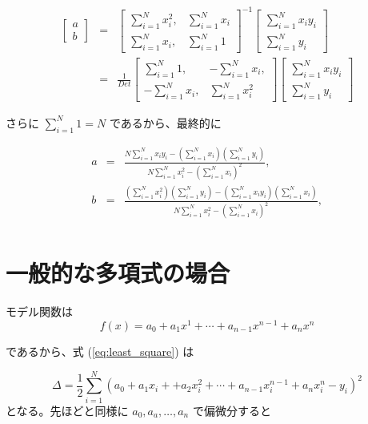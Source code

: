 \documentclass[12pt]{jsarticle}
\def\sumdata{\sum_{i=1}^{N}}
\begin{document}
\begin{eqnarray}
  \begin{bmatrix}
    a \\
    b
  \end{bmatrix}
  &=&
  \begin{bmatrix}
    \sumdata x_i^2, & \sumdata x_i \\
    \sumdata x_i,    & \sumdata 1
  \end{bmatrix} ^{-1}
  \begin{bmatrix}
    \sumdata x_i y_i \\
    \sumdata y_i
  \end{bmatrix} \nonumber \\
  &=&
  \frac{1}{Det}
  \begin{bmatrix}
    \sumdata 1,     & - \sumdata x_i, \\
    - \sumdata x_i, & \sumdata x_i^2
  \end{bmatrix}
  \begin{bmatrix}
    \sumdata x_i y_i \\
    \sumdata y_i
  \end{bmatrix}
\end{eqnarray}

さらに $\sumdata 1 = N$ であるから、最終的に

\begin{eqnarray}
  a &=& \frac{N \sumdata x_i y_i -
    \left( \sumdata x_i \right) \left( \sumdata y_i \right)
  }{N \sumdata x_i^2 - \left( \sumdata x_i \right)^2}, \nonumber \\
  b &=& \frac{
    \left( \sumdata x_i^2 \right) \left( \sumdata y_i \right)
    -
    \left( \sumdata x_i y_i \right) \left( \sumdata x_i \right)
  }{N \sumdata x_i^2 - \left( \sumdata x_i \right)^2}, \nonumber \\
\end{eqnarray}

\section{一般的な多項式の場合}

モデル関数は
\begin{equation}
  f \left( x \right) = a_0 + a_1 x^1 + \cdots + a_{n-1} x^{n-1} + a_n x^n
\end{equation}

であるから、式 (\ref{eq:least_square}) は

\begin{equation}
  \Delta = \frac{1}{2}
  \sumdata \left( a_0 + a_1 x_i + + a_2 x_i^2
  + \cdots + a_{n-1} x_i^{n-1} + a_n x_i^n - y_i \right) ^2
\end{equation}
となる。先ほどと同様に $a_0, a_a, \ldots, a_n$ で偏微分すると
\end{document}
